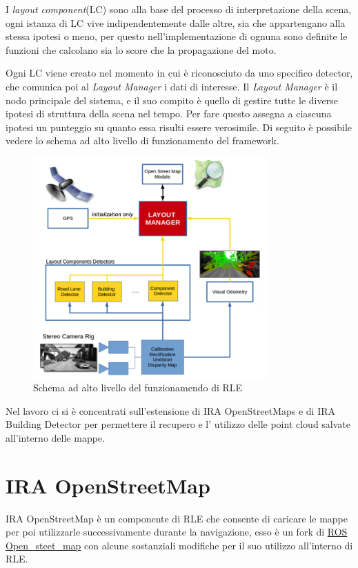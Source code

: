 I \textit{layout component}(LC) sono alla base del processo di interpretazione della scena, ogni istanza di LC vive indipendentemente dalle altre, sia che appartengano alla stessa ipotesi o meno, per questo nell'implementazione di ognuna sono definite le funzioni che calcolano sia lo score che la propagazione del moto.

Ogni LC viene creato nel momento in cui \`e riconosciuto da uno specifico detector, che comunica poi al \textit{Layout Manager} i dati di interesse. Il \textit{Layout Manager} \`e il nodo principale del sistema, e il suo compito \`e quello di gestire tutte le diverse ipotesi di struttura della scena nel tempo. Per fare questo assegna a ciascuna ipotesi un punteggio su quanto essa risulti essere verosimile. Di seguito è possibile vedere lo schema ad alto livello di funzionamento del framework.

\begin{figure}[h!]
    \centering
    \includegraphics[width=0.8\textwidth]{Immagini/rle.png}
    \caption{Schema ad alto livello del funzionamendo di RLE}
    \label{fig:rle}
\end{figure}

Nel lavoro ci si è concentrati sull'estensione di IRA OpenStreetMaps e di IRA Building Detector\cite{CattaneoSergioTesi} per permettere il recupero e l' utilizzo delle point cloud salvate all'interno delle mappe.

\section{IRA OpenStreetMap}
\label{sez:IRAOSM}
IRA OpenStreetMap è un componente di RLE che consente di caricare le mappe per poi utilizzarle successivamente durante la navigazione, esso è un fork di \href{https://github.com/ros-geographic-info/open_street_map}{ROS Open\_steet\_map} con alcune sostanziali modifiche per il suo utilizzo all'interno di RLE.

